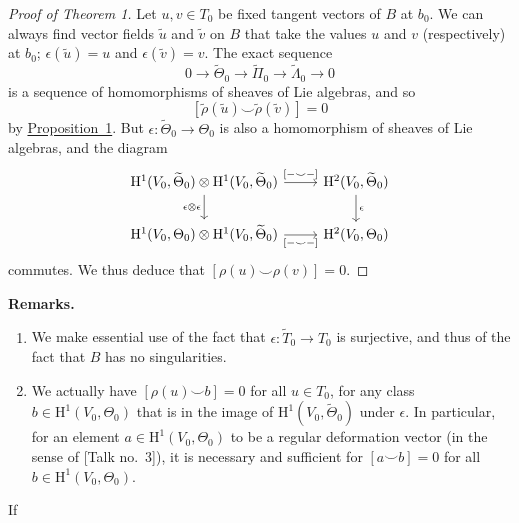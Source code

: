 \documentclass{article}
\newenvironment{rmenv}[1]
  {\phantomsection\par\medskip\noindent\textbf{#1.}\rmfamily}
  {\medskip}
\newcommand{\HH}{\mathrm{H}}
\newcommand{\oldpage}[1]{\marginpar{\footnotesize$\Big\vert$ \textit{p.~#1}}}
\begin{document}
\begin{proof}[Proof of Theorem 1]
  Let $u,v\in T_0$ be fixed tangent vectors of $B$ at $b_0$.
  We can always find vector fields $\widetilde{u}$ and $\widetilde{v}$ on $B$ that take the values $u$ and $v$ (respectively) at $b_0$;
  $\epsilon(\widetilde{u})=u$ and $\epsilon(\widetilde{v})=v$.
  The exact sequence
  \[
    0 \to
    \widetilde{\Theta}_0 \to
    \widetilde{\Pi}_0 \to
    \widetilde{\Lambda}_0 \to
    0
  \]
  is a sequence of homomorphisms of sheaves of Lie algebras, and so
  \[
    [\widetilde{\rho}(\widetilde{u})\smile\widetilde{\rho}(\widetilde{v})] = 0
  \]
  by \hyperref[proposition1]{Proposition~1}.
  But $\epsilon\colon\widetilde{\Theta}_0\to\Theta_0$ is also a homomorphism of sheaves of Lie algebras, and the diagram
  \[
    \begin{tikzcd}
      \HH^1(V_0,\widetilde{\Theta}_0)\otimes\HH^1(V_0,\widetilde{\Theta}_0) \rar["{[-\smile-]}"] \dar[swap,"\epsilon\otimes\epsilon"]
      & \HH^2(V_0,\widetilde{\Theta}_0) \dar["\epsilon"]
    \\\HH^1(V_0,\Theta_0)\otimes\HH^1(V_0,\widetilde{\Theta}_0) \rar[swap,"{[-\smile-]}"]
      & \HH^2(V_0,\Theta_0)
    \end{tikzcd}
  \]
  commutes.
  We thus deduce that $[\rho(u)\smile\rho(v)]=0$.
\end{proof}

\oldpage{4-05}
\begin{rmenv}{Remarks}
  \begin{enumerate}
    \item We make essential use of the fact that $\epsilon\colon\widetilde{T}_0\to T_0$ is surjective, and thus of the fact that $B$ has no singularities.
    \item We actually have $[\rho(u)\smile b]=0$ for all $u\in T_0$, for any class $b\in\HH^1(V_0,\Theta_0)$ that is in the image of $\HH^1(V_0,\widetilde{\Theta}_0)$ under $\epsilon$.
    In particular, for an element $a\in\HH^1(V_0,\Theta_0)$ to be a regular deformation vector (in the sense of [Talk no.~3]), it is necessary and sufficient for $[a\smile b]=0$ for all $b\in\HH^1(V_0,\Theta_0)$.
  \end{enumerate}
\end{rmenv}

If





\nocite{*}
\end{document}
